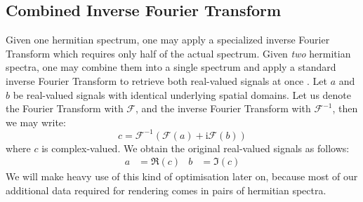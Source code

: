 \subsection{Combined Inverse Fourier Transform}
Given one hermitian spectrum, one may apply a specialized inverse Fourier Transform
which requires only half of the actual spectrum. Given \emph{two} hermitian spectra,
one may combine them into a single spectrum and apply a standard inverse Fourier Transform
to retrieve both real-valued signals at once \citep{fft:handbook}.
Let $a$ and $b$ be real-valued signals with identical underlying spatial domains.
Let us denote the Fourier Transform with $\mathcal{F}$, and the inverse Fourier
Transform with $\mathcal{F}^{-1}$, then we may write:
\begin{equation}
c = \mathcal{F}^{-1}(\mathcal{F}(a)+\mathrm{i}\mathcal{F}(b))
\end{equation}
where $c$ is complex-valued. We obtain the original real-valued signals as follows:
\begin{align*}
a &= \Re(c) & b &= \Im(c)
\end{align*}
%
We will make heavy use of this kind of optimisation later on, because most
of our additional data required for rendering comes in pairs of hermitian spectra.
